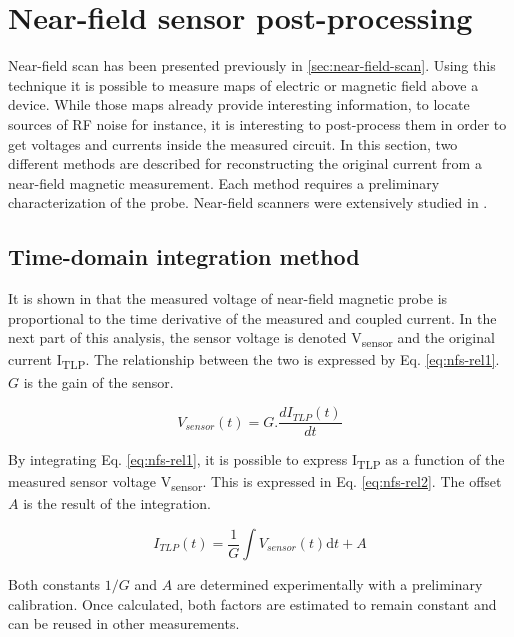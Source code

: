 \section{Near-field sensor post-processing}
\label{sec:on-chip-near-field-process}

Near-field scan has been presented previously in \ref{sec:near-field-scan}.
Using this technique it is possible to measure maps of electric or magnetic field above a device.
While those maps already provide interesting information, to locate sources of RF noise for instance, it is interesting to post-process them in order to get voltages and currents inside the measured circuit.
In this section, two different methods are described for reconstructing the original current from a near-field magnetic measurement.
Each method requires a preliminary characterization of the probe.
Near-field scanners were extensively studied in \cite{near-field-scan, phd-monnereau}.

\subsection{Time-domain integration method}

It is shown in \cite{near-field-scan} that the measured voltage of near-field magnetic probe is proportional to the time derivative of the measured and coupled current.
In the next part of this analysis, the sensor voltage is denoted V\textsubscript{sensor} and the original current I\textsubscript{TLP}.
The relationship between the two is expressed by Eq. \ref{eq:nfs-rel1}.
$G$ is the gain of the sensor.

\begin{equation}
V_{sensor}(t) = G.\frac{dI_{TLP}(t)}{dt}
\label{eq:nfs-rel1}
\end{equation}

By integrating Eq. \ref{eq:nfs-rel1}, it is possible to express I\textsubscript{TLP} as a function of the measured sensor voltage V\textsubscript{sensor}.
This is expressed in Eq. \ref{eq:nfs-rel2}.
The offset $A$ is the result of the integration.

\begin{equation}
I_{TLP}(t) = \frac{1}{G}\int V_{sensor}(t) \mathrm{d}t + A
\label{eq:nfs-rel2}
\end{equation}

Both constants $1/G$ and $A$ are determined experimentally with a preliminary calibration.
Once calculated, both factors are estimated to remain constant and can be reused in other measurements.

